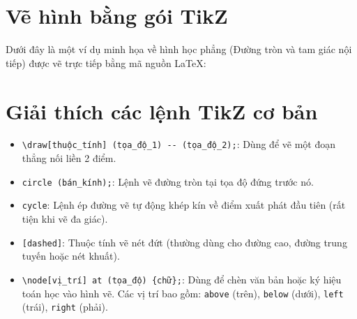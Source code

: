 \documentclass{article}
\begin{document}
\section{Vẽ hình bằng gói TikZ}

Dưới đây là một ví dụ minh họa về hình học phẳng (Đường tròn và tam giác nội tiếp) được vẽ trực tiếp bằng mã nguồn LaTeX:

\begin{center}
\end{center}

\section{Giải thích các lệnh TikZ cơ bản}
\begin{itemize}
    \item \texttt{\textbackslash draw[thuộc\_tính] (tọa\_độ\_1) -{}- (tọa\_độ\_2);}: Dùng để vẽ một đoạn thẳng nối liền 2 điểm.
    \item \texttt{circle (bán\_kính);}: Lệnh vẽ đường tròn tại tọa độ đứng trước nó.
    \item \texttt{cycle}: Lệnh ép đường vẽ tự động khép kín về điểm xuất phát đầu tiên (rất tiện khi vẽ đa giác).
    \item \texttt{[dashed]}: Thuộc tính vẽ nét đứt (thường dùng cho đường cao, đường trung tuyến hoặc nét khuất).
    \item \texttt{\textbackslash node[vị\_trí] at (tọa\_độ) \{chữ\};}: Dùng để chèn văn bản hoặc ký hiệu toán học vào hình vẽ. Các vị trí bao gồm: \texttt{above} (trên), \texttt{below} (dưới), \texttt{left} (trái), \texttt{right} (phải).
\end{itemize}
\end{document}
